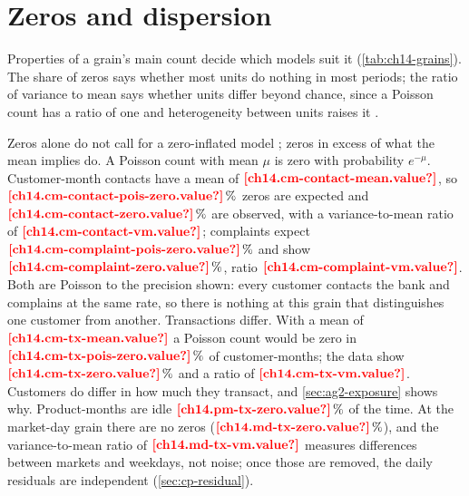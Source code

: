 \section{Zeros and dispersion}\label{sec:ag2-profile}

Properties of a grain's main count decide which models suit it (\cref{tab:ch14-grains}). The share of zeros says
whether most units do nothing in most periods; the ratio of variance to mean says whether units differ beyond chance,
since a Poisson count has a ratio of one and heterogeneity between units raises it \autocite{cameron2013}.



Zeros alone do not call for a zero-inflated model \autocite{lambert1992}; zeros in excess of what the mean implies do. A
Poisson count with mean $\mu$ is zero with probability $e^{-\mu}$. Customer-month contacts have a mean of
$\est{ch14.cm-contact-mean}{value}$, so $\est{ch14.cm-contact-pois-zero}{value}\,\%$ zeros are expected and
$\est{ch14.cm-contact-zero}{value}\,\%$ are observed, with a variance-to-mean ratio of $\est{ch14.cm-contact-vm}{value}$;
complaints expect $\est{ch14.cm-complaint-pois-zero}{value}\,\%$ and show $\est{ch14.cm-complaint-zero}{value}\,\%$, ratio
$\est{ch14.cm-complaint-vm}{value}$. Both are Poisson to the precision shown: every customer contacts the bank and complains at
the same rate, so there is nothing at this grain that distinguishes one customer from another. Transactions differ. With a
mean of $\est{ch14.cm-tx-mean}{value}$ a Poisson count would be zero in $\est{ch14.cm-tx-pois-zero}{value}\,\%$ of
customer-months; the data show $\est{ch14.cm-tx-zero}{value}\,\%$ and a ratio of $\est{ch14.cm-tx-vm}{value}$. Customers do
differ in how much they transact, and \cref{sec:ag2-exposure} shows why. Product-months are idle
$\est{ch14.pm-tx-zero}{value}\,\%$ of the time. At the market-day grain there are no zeros
($\est{ch14.md-tx-zero}{value}\,\%$), and the variance-to-mean ratio of $\est{ch14.md-tx-vm}{value}$ measures differences
between markets and weekdays, not noise; once those are removed, the daily residuals are independent
(\cref{sec:cp-residual}).


